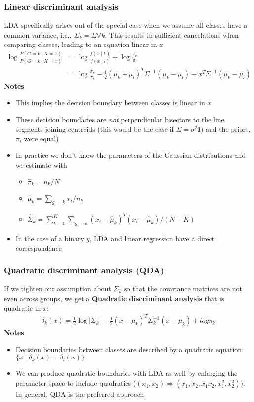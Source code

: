 \documentclass{article}
\newcommand{\abs}[1]{\lvert#1\rvert}
\begin{document}
\subsubsection{Linear discriminant analysis}
LDA specifically arises out of the special case when we assume all classes have a common variance, i.e., $\Sigma_k = \Sigma \forall k$. This results in sufficient cancelations when comparing classes, leading to an equation linear in $x$
\begin{align*}
  \log\frac{P(G=k \mid X=x)}{P(G=k \mid X=x)} &= \log\frac{f(x \mid k)}{f(x \mid l)} + \log\frac{\pi_k}{\pi_l}\\
  &= \log\frac{\pi_k}{\pi_l} - \frac{1}{2}(\mu_k + \mu_l)^T\Sigma^{-1}(\mu_k - \mu_l) + x^T\Sigma^{-1}(\mu_k - \mu_l)
\end{align*}
\textbf{Notes}
\begin{itemize}
  \item This implies the decision boundary between classes is linear in $x$
  \item These decision boundaries are \textit{not} perpendicular bisectors to the line segments joining centroids (this would be the case if $\Sigma = \sigma^2\mathbf{I})$ and the priors, $\pi_i$ were equal)
  \item In practice we don't know the parameters of the Gaussian distributions and we estimate with
  \begin{itemize}
    \item $\hat{\pi}_k = n_k / N$
    \item $\hat{\mu}_k = \sum_{g_i = k}x_i/n_k$
    \item $\hat{\Sigma}_k = \sum_{k=1}^K\sum_{g_i=k}(x_i - \hat{\mu}_k)^T(x_i - \hat{\mu}_k)/(N - K)$
  \end{itemize}
  \item In the case of a binary $y$, LDA and linear regression have a direct correspondence
\end{itemize}


\subsubsection{Quadratic discriminant analysis (QDA)}
If we tighten our assumption about $\Sigma_k$ so that the covariance matrices are not even across groups, we get a \textbf{Quadratic discriminant analysis} that is quadratic in $x$:
\begin{align*}
  \delta_k(x) = \frac{1}{2}\log\abs{\Sigma_k} - \frac{1}{2}(x - \mu_k)^T\Sigma_k^{-1}(x - \mu_k) + log\pi_k
\end{align*}
\textbf{Notes}
\begin{itemize}
  \item Decision boundaries between classes are described by a quadratic equation: $\{x \mid \delta_k(x) = \delta_l(x) \}$
  \item We can produce quadratic boundaries with LDA as well by enlarging the parameter space to include quadratics ($(x_1, x_2) \Longrightarrow (x_1, x_2, x_1x_2, x_1^2, x_2^2))$. In general, QDA is the preferred approach
\end{itemize}
\end{document}

